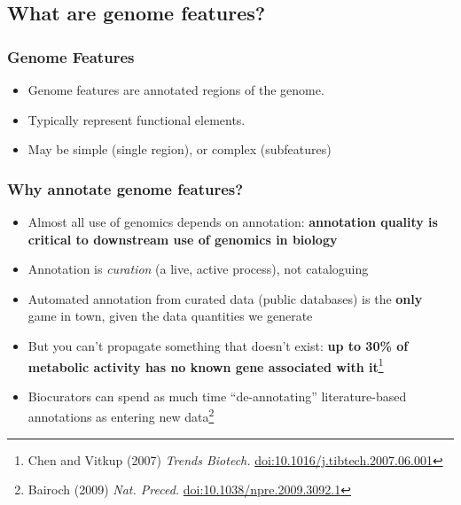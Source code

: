 

\subsection{What are genome features?}

\begin{frame}
  \frametitle{Genome Features}
  \begin{itemize}
    \item Genome features are annotated regions of the genome.
    \item Typically represent functional elements.
    \item May be simple (single region), or complex (subfeatures)
  \end{itemize}
\end{frame}

\begin{frame}
  \frametitle{Why annotate genome features?}
  \begin{itemize}
    \item Almost all use of genomics depends on annotation: \textbf{annotation quality is critical to downstream use of genomics in biology}
    \item Annotation is \textit{curation} (a live, active process), not cataloguing
    \item Automated annotation from curated data (public databases) is the \textbf{only} game in town, given the data quantities we generate
    \item But you can't propagate something that doesn't exist: \textbf{up to 30\% of metabolic activity has no known gene associated with it}\footnote{\tiny{Chen and Vitkup (2007) \textit{Trends Biotech.} \href{http://dx.doi.org/10.1016/j.tibtech.2007.06.001}{doi:10.1016/j.tibtech.2007.06.001}}}
    \item Biocurators can spend as much time ``de-annotating'' literature-based annotations as entering new data\footnote{\tiny{Bairoch (2009) \textit{Nat. Preced.} \href{http://dx.doi.org/10.1038/npre.2009.3092.1}{doi:10.1038/npre.2009.3092.1}}}
  \end{itemize}
\end{frame}

